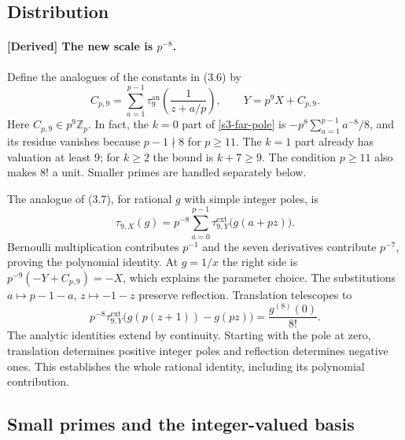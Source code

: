 \subsection{Distribution}

\paragraph{\textnormal{[Derived] The new scale is $p^{-8}$.}}
Define the analogues of the constants in (3.6) by
\begin{equation}
 C_{p,9}=\sum_{a=1}^{p-1}\tau_9^{\mathrm{an}}
                  \!\left(\frac1{z+a/p}\right),
 \qquad Y=p^9X+C_{p,9}.
 \label{s3-distribution-constant}
\end{equation}
Here $C_{p,9}\in p^9\mathbb Z_p$.  In fact, the $k=0$ part of
\eqref{s3-far-pole} is $-p^8\sum_{a=1}^{p-1}a^{-8}/8$, and its residue
vanishes because $p-1\nmid8$ for $p\geq11$.  The $k=1$ part already
has valuation at least $9$; for $k\geq2$ the bound is $k+7\geq9$.
The condition $p\geq11$ also makes $8!$ a unit.  Smaller primes are
handled separately below.

The analogue of (3.7), for rational $g$ with simple integer poles, is
\begin{equation}
 \tau_{9,X}(g)=p^{-8}\sum_{a=0}^{p-1}
        \tau^{\mathrm{ext}}_{9,Y}\bigl(g(a+pz)\bigr).
 \label{s3-distribution}
\end{equation}
Bernoulli multiplication contributes $p^{-1}$ and the seven derivatives
contribute $p^{-7}$, proving the polynomial identity.  At $g=1/x$ the
right side is $p^{-9}(-Y+C_{p,9})=-X$, which explains the parameter choice.
The substitutions $a\mapsto p-1-a$, $z\mapsto-1-z$ preserve reflection.
Translation telescopes to
\[
 p^{-8}\tau^{\mathrm{ext}}_{9,Y}
       \bigl(g(p(z+1))-g(pz)\bigr)=\frac{g^{(8)}(0)}{8!}.
\]
The analytic identities extend by continuity.  Starting with the pole
at zero, translation determines positive integer poles and reflection
determines negative ones.  This establishes the whole rational identity,
including its polynomial contribution.

\subsection{Small primes and the integer-valued basis}

